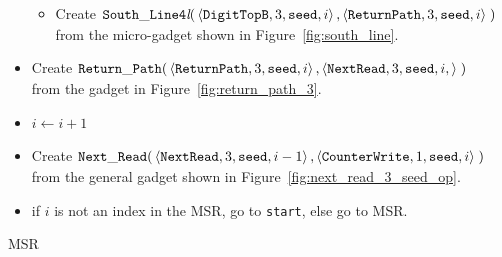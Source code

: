 \begin{itemize}
\begin{itemize}
        \item Create
        $\begin{aligned}[t]
            {\tt South\_Line4\textit{l}}(&\left\langle {\tt DigitTopB},  3, {\tt seed}, i \right\rangle,
                                          \left\langle {\tt ReturnPath}, 3, {\tt seed}, i \right\rangle \;)
        \end{aligned}$\\from the micro-gadget shown in Figure~\ref{fig:south_line}.
    \end{itemize}

    \item Create
    $\begin{aligned}[t]
        {\tt Return\_Path}(&\left\langle {\tt ReturnPath}, 3, {\tt seed}, i  \right\rangle,
                     \left\langle {\tt NextRead},   3, {\tt seed}, i, \right\rangle \;)
    \end{aligned}$\\from the gadget in Figure~\ref{fig:return_path_3}.

    \item $i \gets i + 1$

    \item Create
    $\begin{aligned}[t]
        {\tt Next\_Read}(&\left\langle {\tt NextRead},  3, {\tt seed}, i - 1 \right\rangle,
                   \left\langle {\tt CounterWrite},     1, {\tt seed}, i     \right\rangle \;)
    \end{aligned}$\\ from the general gadget shown in Figure~\ref{fig:next_read_3_seed_op}.

    \item if $i$ is not an index in the MSR, go to {\tt start}, else go to MSR.
\end{itemize}

\vspace{1cm}




\Huge{MSR}\normalsize



